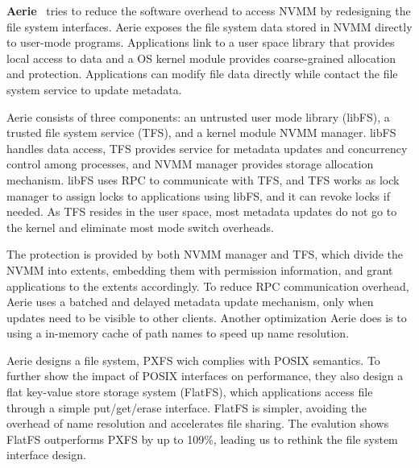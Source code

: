 
\textbf{Aerie}~\cite{Aerie} tries to reduce the software overhead to access NVMM
by redesigning the file system interfaces. Aerie exposes the file system
data stored in NVMM directly to user-mode programs. Applications link to
a user space library that provides local access to data and a OS kernel
module provides coarse-grained allocation and protection. Applications can
modify file data directly while contact the file system service to update
metadata.

Aerie consists of three components: an untrusted user mode library (libFS),
a trusted file system service (TFS), and a kernel module NVMM manager. libFS
handles data access, TFS provides service for metadata updates and concurrency
control among processes, and NVMM manager provides storage allocation mechanism.
libFS uses RPC to communicate with TFS, and TFS works as lock manager to 
assign locks to applications using libFS, and it can revoke locks if needed.
As TFS resides in the user space, most metadata updates do not go to the kernel
and eliminate most mode switch overheads.

The protection is provided by both NVMM manager and TFS, which divide the NVMM
into extents, embedding them with permission information, and grant applications
to the extents accordingly. To reduce RPC communication overhead, Aerie
uses a batched and delayed metadata update mechanism, only when updates need to
be visible to other clients. Another optimization Aerie does is to using
a in-memory cache of path names to speed up name resolution.

Aerie designs a file system, PXFS wich complies with POSIX semantics.
To further show the impact of POSIX interfaces on performance, they also design a flat
key-value store storage system (FlatFS), which applications access file
through a simple put/get/erase interface. FlatFS is simpler, avoiding the
overhead of name resolution and accelerates file sharing. The evalution shows FlatFS
outperforms PXFS by up to 109\%, leading us to rethink the file system interface design.


